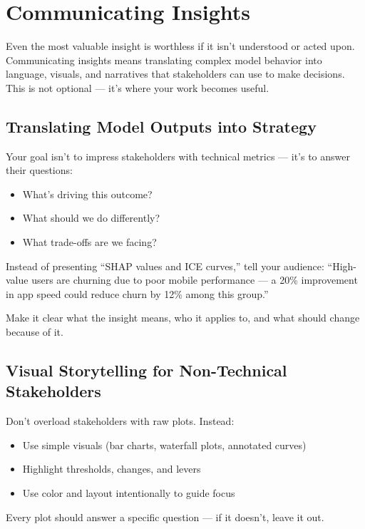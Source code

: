 \documentclass[12pt,openany]{book}
\begin{document}
\chapter{Communicating Insights}

Even the most valuable insight is worthless if it isn’t understood or acted upon. Communicating insights means translating complex model behavior into language, visuals, and narratives that stakeholders can use to make decisions. This is not optional — it’s where your work becomes useful.

\section{Translating Model Outputs into Strategy}

Your goal isn’t to impress stakeholders with technical metrics — it’s to answer their questions:
\begin{itemize}
  \item What’s driving this outcome?
  \item What should we do differently?
  \item What trade-offs are we facing?
\end{itemize}

\begin{examplebox}
Instead of presenting “SHAP values and ICE curves,” tell your audience: “High-value users are churning due to poor mobile performance — a 20\% improvement in app speed could reduce churn by 12\% among this group.”
\end{examplebox}

Make it clear what the insight means, who it applies to, and what should change because of it.

\section{Visual Storytelling for Non-Technical Stakeholders}

Don’t overload stakeholders with raw plots. Instead:
\begin{itemize}
  \item Use simple visuals (bar charts, waterfall plots, annotated curves)
  \item Highlight thresholds, changes, and levers
  \item Use color and layout intentionally to guide focus
\end{itemize}

\begin{notebox}
Every plot should answer a specific question — if it doesn’t, leave it out.
\end{notebox}
\end{document}
